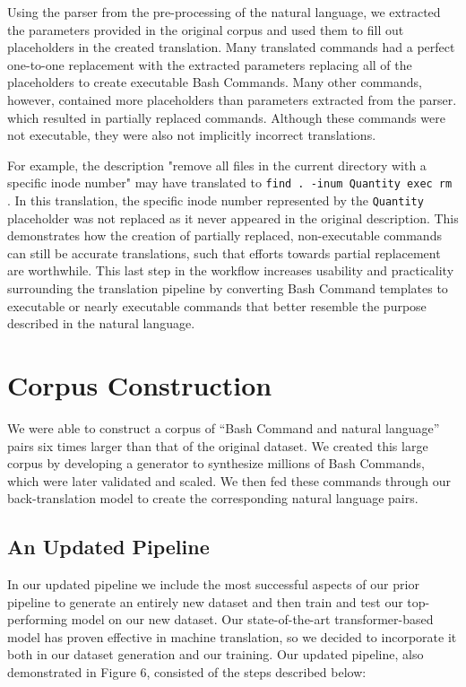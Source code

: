 \documentclass{river-journal}
\begin{document}
Using the parser from the pre-processing of the natural language, we extracted the parameters provided in the original corpus and used them to fill out placeholders in the created translation. Many translated commands had a perfect one-to-one replacement with the extracted parameters replacing all of the placeholders to create executable Bash Commands. Many other commands, however, contained more placeholders than parameters extracted from the parser. which resulted in partially replaced commands. Although these commands were not executable, they were also not implicitly incorrect translations.

For example, the description "remove all files in the current directory with a specific inode number" may have translated to \texttt{find . -inum Quantity exec rm {}}. In this translation, the specific inode number represented by the \texttt{Quantity} placeholder was not replaced as it never appeared in the original description. This demonstrates how the creation of partially replaced, non-executable commands can still be accurate translations, such that efforts towards partial replacement are worthwhile. This last step in the workflow increases usability and practicality surrounding the translation pipeline by converting Bash Command templates to executable or nearly executable commands that better resemble the purpose described in the natural language.

\section{Corpus Construction}
\label{corpus}

We were able to construct a corpus of ``Bash Command and natural language'' pairs six times larger than that of the original dataset. We created this large corpus by developing a generator to synthesize millions of Bash Commands, which were later validated and scaled. We then fed these commands through our back-translation model to create the corresponding natural language pairs.

\subsection{An Updated Pipeline}
\label{distribution}

In our updated pipeline we include the most successful aspects of our prior pipeline to generate an entirely new dataset and then train and test our top-performing model on our new dataset. Our state-of-the-art transformer-based model has proven effective in machine translation, so we decided to incorporate it both in our dataset generation and our training. Our updated pipeline, also demonstrated in Figure 6, consisted of the steps described below:
\end{document}
